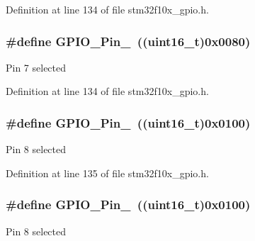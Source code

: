 Definition at line 134 of file stm32f10x\+\_\+gpio.\+h.

\subsubsection[{\texorpdfstring{G\+P\+I\+O\+\_\+\+Pin\+\_\+7}{GPIO_Pin_7}}]{\setlength{\rightskip}{0pt plus 5cm}\#define G\+P\+I\+O\+\_\+\+Pin\+\_~(({\bf uint16\+\_\+t})0x0080)}\hypertarget{group___g_p_i_o__pins__define_ga7346b6ce5507bd28a7a79e7dcc816c08}{}\label{group___g_p_i_o__pins__define_ga7346b6ce5507bd28a7a79e7dcc816c08}
Pin 7 selected 

Definition at line 134 of file stm32f10x\+\_\+gpio.\+h.

\subsubsection[{\texorpdfstring{G\+P\+I\+O\+\_\+\+Pin\+\_\+8}{GPIO_Pin_8}}]{\setlength{\rightskip}{0pt plus 5cm}\#define G\+P\+I\+O\+\_\+\+Pin\+\_~(({\bf uint16\+\_\+t})0x0100)}\hypertarget{group___g_p_i_o__pins__define_gac891f0984dc64af3567577fbf13ab304}{}\label{group___g_p_i_o__pins__define_gac891f0984dc64af3567577fbf13ab304}
Pin 8 selected 

Definition at line 135 of file stm32f10x\+\_\+gpio.\+h.

\subsubsection[{\texorpdfstring{G\+P\+I\+O\+\_\+\+Pin\+\_\+8}{GPIO_Pin_8}}]{\setlength{\rightskip}{0pt plus 5cm}\#define G\+P\+I\+O\+\_\+\+Pin\+\_~(({\bf uint16\+\_\+t})0x0100)}\hypertarget{group___g_p_i_o__pins__define_gac891f0984dc64af3567577fbf13ab304}{}\label{group___g_p_i_o__pins__define_gac891f0984dc64af3567577fbf13ab304}
Pin 8 selected 

